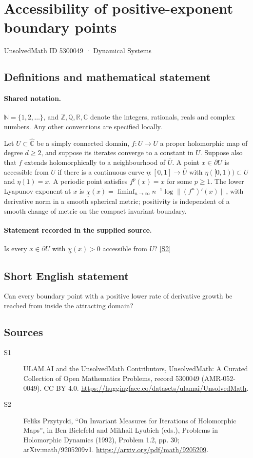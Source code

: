 \documentclass[11pt]{article}
\newcommand{\sref}[2]{\hyperlink{source:#1:#2}{[S#2]}}
\begin{document}
\setcounter{section}{5300048}
\section{Accessibility of positive-exponent boundary points}\label{5300049}
{\small\sffamily UnsolvedMath ID 5300049 · Dynamical Systems}
\subsection{Definitions and mathematical statement}

\paragraph{Shared notation.}$\mathbb N=\{1,2,\ldots\}$, and $\mathbb Z,\mathbb Q,\mathbb R,\mathbb C$ denote the integers, rationals, reals and complex numbers. Any other conventions are specified locally.


Let $U\subset\widehat{\mathbb C}$ be a simply connected domain, $f:U\to U$ a proper holomorphic map of degree $d\geq2$, and suppose its iterates converge to a constant in $U$. Suppose also that $f$ extends holomorphically to a neighbourhood of $\overline U$. A point $x\in\partial U$ is accessible from $U$ if there is a continuous curve $\eta:[0,1]\to\overline U$ with $\eta([0,1))\subset U$ and $\eta(1)=x$. A periodic point satisfies $f^p(x)=x$ for some $p\geq1$. The lower Lyapunov exponent at $x$ is $\underline\chi(x)=\liminf_{n\to\infty}n^{-1}\log\|(f^n)'(x)\|$, with derivative norm in a smooth spherical metric; positivity is independent of a smooth change of metric on the compact invariant boundary.
\paragraph{Statement recorded in the supplied source.}
Is every $x\in\partial U$ with $\underline\chi(x)>0$ accessible from $U$? \sref{5300049}{2}
\subsection{Short English statement}
Can every boundary point with a positive lower rate of derivative growth be reached from inside the attracting domain?
\subsection{Sources}
\begin{description}
\item[\hypertarget{source:5300049:1}{S1}] ULAM.AI and the UnsolvedMath Contributors, UnsolvedMath: A Curated Collection of Open Mathematics Problems, record 5300049 (AMR-052-0049). CC BY 4.0. \url{https://huggingface.co/datasets/ulamai/UnsolvedMath}.
\item[\hypertarget{source:5300049:2}{S2}] Feliks Przytycki, ``On Invariant Measures for Iterations of Holomorphic Maps'', in Ben Bielefeld and Mikhail Lyubich (eds.), Problems in Holomorphic Dynamics (1992), Problem 1.2, pp. 30; arXiv:math/9205209v1. \url{https://arxiv.org/pdf/math/9205209}.
\end{description}
\label{end:5300049}
\end{document}
